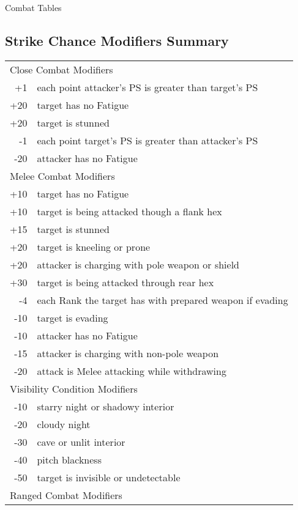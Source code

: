 \begin{Table}{Combat Tables}

\begin{multicols}{3}

\raggedcolumns
  
\section{Strike Chance Modifiers Summary}

\begin{tabularx}{\columnwidth}{rX}
\multicolumn{2}{l}{Close Combat Modifiers} \\
+1 	& each point attacker’s PS is greater than target’s PS \\
+20	& target has no Fatigue \\
+20	& target is stunned \\
-1	& each point target’s PS is greater than attacker’s PS \\
-20	& attacker has no Fatigue \\
\multicolumn{2}{l}{Melee Combat Modifiers} \\
+10	& target has no Fatigue \\
+10	& target is being attacked though a flank hex \\
+15	& target is stunned \\
+20	& target is kneeling or prone \\
+20	& attacker is charging with pole weapon or shield \\
+30	& target is being attacked through rear hex \\
-4	& each Rank the target has with prepared weapon if evading \\
-10	& target is evading \\
-10	& attacker has no Fatigue \\
-15	& attacker is charging with non-pole weapon \\
-20	& attack is Melee attacking while withdrawing \\
\multicolumn{2}{l}{Visibility Condition Modifiers} \\
-10	& starry night or shadowy interior \\
-20	& cloudy night \\
-30	& cave or unlit interior \\
-40	& pitch blackness \\
-50	& target is invisible or undetectable \\
\multicolumn{2}{l}{Ranged Combat Modifiers} \\

\end{tabularx}
\end{multicols}
\end{Table}
